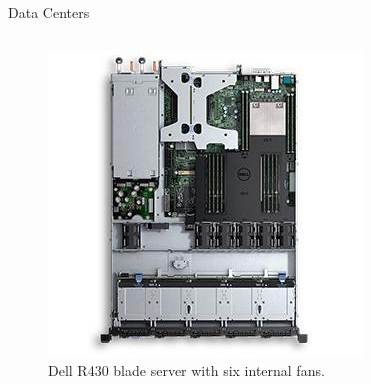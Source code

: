 \documentclass{beamer}
\begin{document}
\begin{frame}{Data Centers}
\begin{columns}[T]%
\begin{column}{.5\textwidth}
\begin{figure}[ht]
\begin{center}
\includegraphics[width=1.2\linewidth]{dell_r430.jpg}
\end{center}
\caption{Dell R430 blade server with six internal fans.}
\end{figure}
\end{column}%
\hfill%
\begin{column}{.5\textwidth}
\begin{figure}[ht]
\begin{center}

\end{center}
\end{figure}
\end{column}
\end{columns}
\end{frame}
\end{document}

